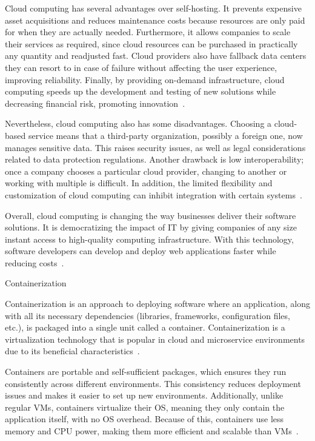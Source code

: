 \documentclass[12pt, reqno]{amsbook}
\makeatletter
\def\section{\@startsection{section}{1}%
      \z@{.5\linespacing\@plus.7\linespacing}{.25\linespacing}%
      {\normalfont\bfseries\flushleft}}
\theoremstyle{definition}
\theoremstyle{definition}
\numberwithin{section}{chapter}
\numberwithin{table}{chapter}
\numberwithin{figure}{chapter}
\makeatother
\begin{document}
Cloud computing has several advantages over self-hosting. It prevents expensive asset acquisitions and reduces maintenance costs because resources are only paid for when they are actually needed. Furthermore, it allows companies to scale their services as required, since cloud resources can be purchased in practically any quantity and readjusted fast. Cloud providers also have fallback data centers they can resort to in case of failure without affecting the user experience, improving reliability. Finally, by providing on-demand infrastructure, cloud computing speeds up the development and testing of new solutions while decreasing financial risk, promoting innovation~\cite{Figueira2024, Nordic2012, Alam2020, Nadeem2024, Villamizar2016}.

Nevertheless, cloud computing also has some disadvantages. Choosing a cloud-based service means that a third-party organization, possibly a foreign one, now manages sensitive data. This raises security issues, as well as legal considerations related to data protection regulations. Another drawback is low interoperability; once a company chooses a particular cloud provider, changing to another or working with multiple is difficult. In addition, the limited flexibility and customization of cloud computing can inhibit integration with certain systems~\cite{Nordic2012, Alam2020}.

Overall, cloud computing is changing the way businesses deliver their software solutions. It is democratizing the impact of \ac{IT} by giving companies of any size instant access to high-quality computing infrastructure. With this technology, software developers can develop and deploy web applications faster while reducing costs~\cite{Figueira2024, Berry2021, Nadeem2024}.

\section{Containerization}

Containerization is an approach to deploying software where an application, along with all its necessary dependencies (libraries, frameworks, configuration files, etc.), is packaged into a single unit called a container. Containerization is a virtualization technology that is popular in cloud and microservice environments due to its beneficial characteristics~\cite{Figueira2024, Hardikar2021, Potdar2020}.

Containers are portable and self-sufficient packages, which ensures they run consistently across different environments. This consistency reduces deployment issues and makes it easier to set up new environments. Additionally, unlike regular \acp{VM}, containers virtualize their \ac{OS}, meaning they only contain the application itself, with no \ac{OS} overhead. Because of this, containers use less memory and \ac{CPU} power, making them more efficient and scalable than \acp{VM}~\cite{Figueira2024, Hardikar2021, Potdar2020}.
\end{document}
